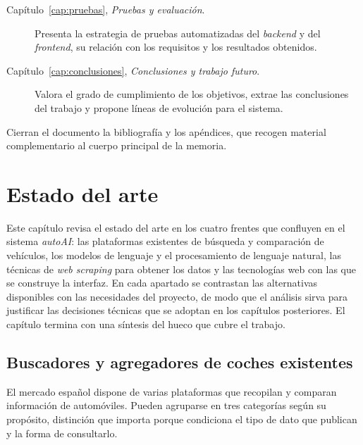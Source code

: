 \begin{description}
  \item[Capítulo~\ref{cap:pruebas}, \emph{Pruebas y evaluación}.] Presenta la
        estrategia de pruebas automatizadas del \emph{backend} y del
        \emph{frontend}, su relación con los requisitos y los resultados obtenidos.

  \item[Capítulo~\ref{cap:conclusiones}, \emph{Conclusiones y trabajo futuro}.]
        Valora el grado de cumplimiento de los objetivos, extrae las conclusiones
        del trabajo y propone líneas de evolución para el sistema.
\end{description}

Cierran el documento la bibliografía y los apéndices, que recogen material
complementario al cuerpo principal de la memoria.


\chapter{Estado del arte}
\label{cap:estado-arte}

Este capítulo revisa el estado del arte en los cuatro frentes que confluyen en
el sistema \emph{autoAI}: las plataformas existentes de búsqueda y comparación de
vehículos, los modelos de lenguaje y el procesamiento de lenguaje natural, las
técnicas de \emph{web scraping} para obtener los datos y las tecnologías web con
las que se construye la interfaz. En cada apartado se contrastan las alternativas
disponibles con las necesidades del proyecto, de modo que el análisis sirva para
justificar las decisiones técnicas que se adoptan en los capítulos posteriores.
El capítulo termina con una síntesis del hueco que cubre el trabajo.

\section{Buscadores y agregadores de coches existentes}
\label{sec:arte-buscadores}

El mercado español dispone de varias plataformas que recopilan y comparan
información de automóviles. Pueden agruparse en tres categorías según su
propósito, distinción que importa porque condiciona el tipo de dato que publican
y la forma de consultarlo.

